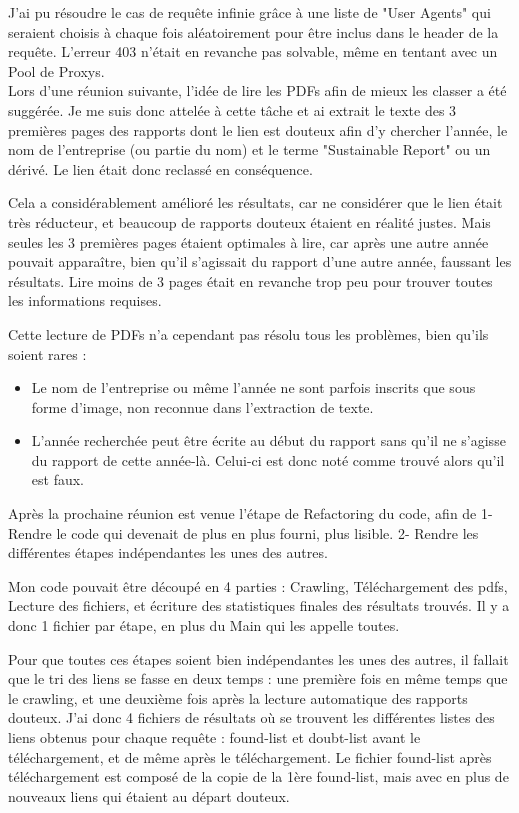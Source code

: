 J'ai pu résoudre le cas de requête infinie grâce à une liste de "User Agents" qui seraient choisis à chaque fois aléatoirement pour être inclus dans le header de la requête.
L'erreur 403 n'était en revanche pas solvable, même en tentant avec un Pool de Proxys. 
\\

Lors d'une réunion suivante, l'idée de lire les PDFs afin de mieux les classer a été suggérée. 
Je me suis donc attelée à cette tâche et ai extrait le texte des 3 premières pages des rapports dont le lien est douteux afin d'y chercher l'année, le nom de l'entreprise (ou partie du nom) et le terme "Sustainable Report" ou un dérivé.
Le lien était donc reclassé en conséquence.

Cela a considérablement amélioré les résultats, car ne considérer que le lien était très réducteur, et beaucoup de rapports douteux étaient en réalité justes.
Mais seules les 3 premières pages étaient optimales à lire, car après une autre année pouvait apparaître, bien qu'il s'agissait du rapport d'une autre année, faussant les résultats.
Lire moins de 3 pages était en revanche trop peu pour trouver toutes les informations requises.

Cette lecture de PDFs n'a cependant pas résolu tous les problèmes, bien qu'ils soient rares :
\begin{itemize}
    \item Le nom de l'entreprise ou même l'année ne sont parfois inscrits que sous forme d'image, non reconnue dans l'extraction de texte.
    \item L'année recherchée peut être écrite au début du rapport sans qu'il ne s'agisse du rapport de cette année-là. Celui-ci est donc noté comme trouvé alors qu'il est faux.
\end{itemize}

Après la prochaine réunion est venue l'étape de Refactoring du code, afin de 1-Rendre le code qui devenait de plus en plus fourni, plus lisible. 
2- Rendre les différentes étapes indépendantes les unes des autres.

Mon code pouvait être découpé en 4 parties : Crawling, Téléchargement des pdfs, Lecture des fichiers, et écriture des statistiques finales des résultats trouvés.
Il y a donc 1 fichier par étape, en plus du Main qui les appelle toutes. 

Pour que toutes ces étapes soient bien indépendantes les unes des autres, il fallait que le tri des liens se fasse en deux temps : une première fois en même temps que le crawling, et une deuxième fois après la lecture automatique des rapports douteux.
J'ai donc 4 fichiers de résultats où se trouvent les différentes listes des liens obtenus pour chaque requête : found-list et doubt-list avant le téléchargement, et de même après le téléchargement.
Le fichier found-list après téléchargement est composé de la copie de la 1ère found-list, mais avec en plus de nouveaux liens qui étaient au départ douteux.

